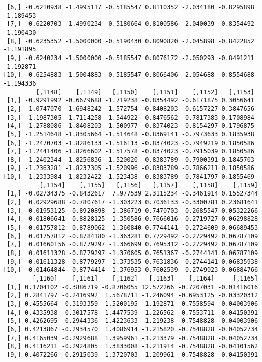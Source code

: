 \documentclass[
  letterpaper,
  DIV=11,
  numbers=noendperiod]{scrreprt}
\begin{document}
\begin{verbatim}
 [6,] -0.6210938 -1.4995117 -0.5185547 0.8110352 -2.034180 -0.8295898 -1.189453
 [7,] -0.6220703 -1.4990234 -0.5180664 0.8100586 -2.040039 -0.8354492 -1.190430
 [8,] -0.6235352 -1.5000000 -0.5190430 0.8090820 -2.045898 -0.8422852 -1.191895
 [9,] -0.6240234 -1.5000000 -0.5185547 0.8076172 -2.050293 -0.8491211 -1.192871
[10,] -0.6254883 -1.5004883 -0.5185547 0.8066406 -2.054688 -0.8554688 -1.194336
         [,1148]    [,1149]   [,1150]    [,1151]    [,1152]   [,1153]
 [1,] -0.9291992 -0.6679688 -1.719238 -0.8354492 -0.6171875 0.3056641
 [2,] -1.0747070 -1.6948242 -1.572754 -0.8408203 -0.6157227 0.3847656
 [3,] -1.1987305 -1.7114258 -1.544922 -0.8476562 -0.7817383 0.1708984
 [4,] -1.2788086 -1.8408203 -1.500977 -0.8374023 -0.8154297 0.1796875
 [5,] -1.2514648 -1.8305664 -1.514648 -0.8369141 -0.7973633 0.1835938
 [6,] -1.2470703 -1.8286133 -1.516113 -0.8374023 -0.7949219 0.1850586
 [7,] -1.2441406 -1.8266602 -1.517578 -0.8374023 -0.7915039 0.1850586
 [8,] -1.2402344 -1.8256836 -1.520020 -0.8383789 -0.7900391 0.1845703
 [9,] -1.2363281 -1.8237305 -1.520996 -0.8383789 -0.7866211 0.1850586
[10,] -1.2333984 -1.8232422 -1.523438 -0.8383789 -0.7841797 0.1855469
          [,1154]    [,1155]   [,1156]   [,1157]    [,1158]    [,1159]
 [1,] -0.02734375 -0.8432617  7.977539 2.3115234 -0.3461914 0.15527344
 [2,]  0.02929688 -0.7807617 -1.303223 0.7036133 -0.3300781 0.23681641
 [3,]  0.01953125 -0.8920898 -1.386719 0.7470703 -0.2685547 0.05322266
 [4,]  0.01806641 -0.8828125 -1.350586 0.7666016 -0.2719727 0.06298828
 [5,]  0.01757812 -0.8789062 -1.360840 0.7744141 -0.2724609 0.06689453
 [6,]  0.01757812 -0.8784180 -1.363281 0.7729492 -0.2729492 0.06787109
 [7,]  0.01660156 -0.8779297 -1.366699 0.7695312 -0.2729492 0.06787109
 [8,]  0.01611328 -0.8779297 -1.370605 0.7651367 -0.2744141 0.06787109
 [9,]  0.01611328 -0.8779297 -1.373535 0.7631836 -0.2744141 0.06835938
[10,]  0.01464844 -0.8774414 -1.376953 0.7602539 -0.2749023 0.06884766
        [,1160]    [,1161]    [,1162]   [,1163]    [,1164]     [,1165]
 [1,] 0.1704102 -0.3886719 -0.8706055 12.572266 -0.7207031 -0.01416016
 [2,] 0.2841797 -0.2416992  1.5678711 -1.246094 -0.6953125 -0.03320312
 [3,] 0.4555664 -0.3193359  1.5200195 -1.192871 -0.7558594 -0.04003906
 [4,] 0.4335938 -0.3017578  1.4477539 -1.226562 -0.7553711 -0.04150391
 [5,] 0.4262695 -0.2944336  1.4223633 -1.219238 -0.7548828 -0.04003906
 [6,] 0.4213867 -0.2934570  1.4086914 -1.215820 -0.7548828 -0.04052734
 [7,] 0.4165039 -0.2929688  1.3959961 -1.213379 -0.7548828 -0.04052734
 [8,] 0.4116211 -0.2924805  1.3833008 -1.211914 -0.7548828 -0.04101562
 [9,] 0.4072266 -0.2915039  1.3720703 -1.209961 -0.7548828 -0.04150391

\end{verbatim}
\end{document}
